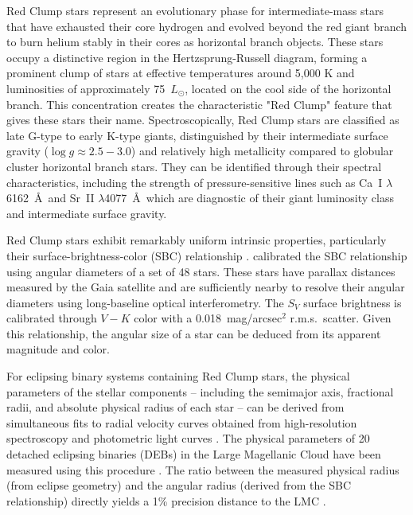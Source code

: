 \documentclass[linenumbers,trackchanges,margins]{aastex701}
\begin{document}
Red Clump stars represent an evolutionary phase for intermediate-mass stars 
that have exhausted their core hydrogen and evolved beyond the red giant branch to burn helium stably in their cores as horizontal branch objects. These stars occupy a distinctive region in the Hertzsprung-Russell diagram, forming a prominent clump of stars at effective temperatures around 5,000 K and luminosities of approximately 75~$L_\odot$, located on the cool side of the horizontal branch. This concentration creates the characteristic "Red Clump" feature that gives these stars their name.
Spectroscopically, Red Clump stars are classified as late G-type to early K-type giants, distinguished by their intermediate surface gravity ($\log g \approx 2.5-3.0$) and relatively high metallicity compared to globular cluster horizontal branch stars. They can be identified through their spectral characteristics, including the strength of pressure-sensitive lines such as Ca~I $\lambda$6162~\AA\  
and Sr~II $\lambda$4077~\AA\, which are diagnostic of their giant luminosity class and intermediate surface gravity. 


Red Clump stars exhibit remarkably uniform intrinsic properties, particularly their surface-brightness-color (SBC) relationship \citep{1969MNRAS.144..297W, 2019Natur.567..200P}.
\citet{2019Natur.567..200P} calibrated the SBC relationship using angular diameters of a set of 48 stars. These stars have parallax distances measured by the Gaia satellite \citep{2016A&A...595A...1G} and are sufficiently nearby to resolve their angular diameters using long-baseline optical interferometry. 
The $S_V$ surface brightness is calibrated through
$V-K$ color with a 0.018~mag/arcsec$^2$ r.m.s.\ scatter.
Given this relationship, the angular size of a star can be deduced from its apparent magnitude and color.

For eclipsing binary systems containing Red Clump stars, the physical parameters of the stellar components -- including the semimajor axis, fractional radii, and absolute physical radius of each star -- can be derived from simultaneous fits to radial velocity curves obtained from high-resolution spectroscopy and photometric light curves \citep{2012ApJ...750..144G}.
The physical parameters of 20 detached eclipsing binaries (DEBs) in the Large Magellanic Cloud have been measured using this procedure \citep{2018ApJ...860....1G}. 
The ratio between the measured physical radius (from eclipse geometry) and the angular radius (derived from the SBC relationship) directly yields a 1\% precision distance to the LMC \citep{2019Natur.567..200P}.
\end{document}
